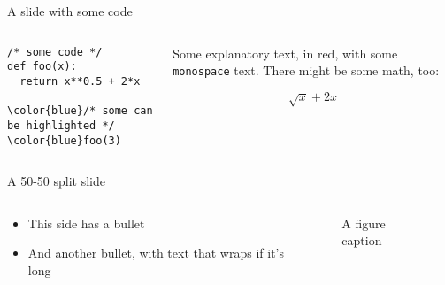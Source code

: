 \documentclass[14pt,aspectratio=169]{beamer}
\begin{document}
\begin{frame}[fragile]{A slide with some code}

	\begin{columns}
		\begin{column}{0.5\linewidth}
			\footnotesize
			\begin{Verbatim}[commandchars=\\\{\}]
/* some code */
def foo(x):
  return x**0.5 + 2*x

\color{blue}/* some can be highlighted */
\color{blue}foo(3)
      \end{Verbatim}
    \end{column}
    \begin{column}{0.5\linewidth}
      {\color{red} Some explanatory text, in red, with some \texttt{monospace} text.}
      There might be some math, too:

      $$\sqrt{x} + 2x$$
    \end{column}
  \end{columns}

\end{frame}

\begin{frame}{A 50-50 split slide}

  \begin{columns}
    \begin{column}{0.5\linewidth}
      \begin{itemize}
        \item This side has a bullet
        \item And another bullet, with text that wraps if it's long
      \end{itemize}
    \end{column}
    \begin{column}{0.5\linewidth}
      \begin{figure}
        \centering
        \caption{A figure caption}
      \end{figure}
    \end{column}
  \end{columns}


\end{frame}
\end{document}
